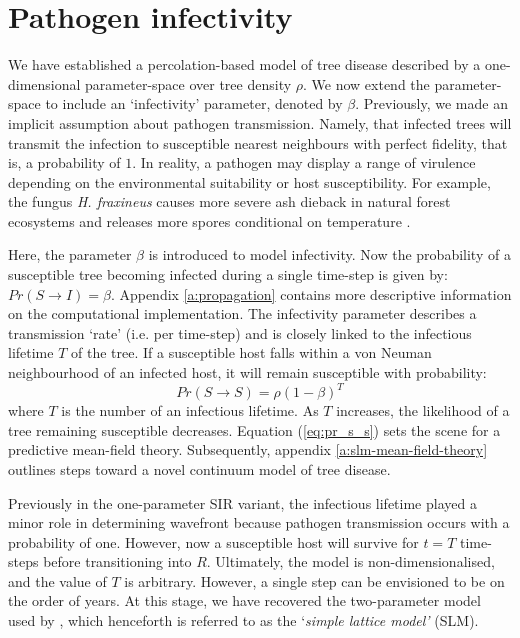 \section{Pathogen infectivity}
\label{ch3:two-param-model}

We have established a percolation-based model of tree disease described by a one-dimensional parameter-space over tree density $\rho$. %
We now extend the parameter-space to include an `infectivity' parameter, denoted by $\beta$. %
Previously, we made an implicit assumption about pathogen transmission. Namely, that infected trees will transmit the infection to susceptible nearest neighbours with perfect fidelity, that is, a probability of $1$. 
In reality, a pathogen may display a range of virulence depending on the environmental suitability or host susceptibility. For example, the fungus \textit{H. fraxineus} causes more severe ash dieback in natural forest ecosystems \cite{marciulyniene2017can} and releases more spores conditional on temperature \cite{chandelier2014detection}.

Here, the parameter $\beta$ is introduced to model infectivity. Now the probability of a susceptible tree becoming infected during a single time-step is given by: $Pr(S \rightarrow I) = \beta$. Appendix \ref{a:propagation} contains more descriptive information on the computational implementation. 
The infectivity parameter describes a transmission `rate' (i.e. per time-step) and is closely linked to the infectious lifetime $T$ of the tree. %
If a susceptible host falls within a von Neuman neighbourhood of an infected host, it will remain susceptible with probability:
\begin{equation}
\label{eq:pr_s_s}
    Pr(S \rightarrow S) = \rho(1 -\beta)^T
\end{equation}
where $T$ is the number of an infectious lifetime. As $T$ increases, the likelihood of a tree remaining susceptible decreases.
Equation (\ref{eq:pr_s_s}) sets the scene for a predictive mean-field theory.
Subsequently, appendix \ref{a:slm-mean-field-theory} outlines steps toward a novel continuum model of tree disease.

Previously in the one-parameter SIR variant, the infectious lifetime played a minor role in determining wavefront because pathogen transmission occurs with a probability of one.
However, now a susceptible host will survive for $t=T$ time-steps before transitioning into $R$. Ultimately, the model is non-dimensionalised, and the value of $T$ is arbitrary. However, a single step can be envisioned to be on the order of years. At this stage, we have recovered the two-parameter model used by \cite{OROZCOFUENTES201912}, which henceforth is referred to as the `\textit{simple lattice model'} (SLM). 

